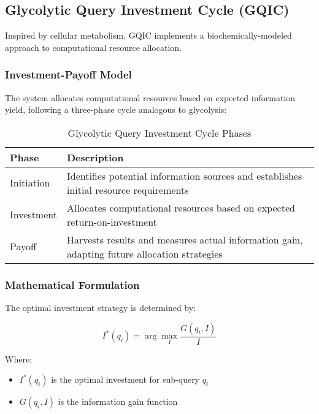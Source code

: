 \documentclass[journal,onecolumn]{IEEEtran}
\begin{document}
\subsection{Glycolytic Query Investment Cycle (GQIC)}

Inspired by cellular metabolism, GQIC implements a biochemically-modeled approach to computational resource allocation.

\subsubsection{Investment-Payoff Model}

The system allocates computational resources based on expected information yield, following a three-phase cycle analogous to glycolysis:

\begin{table}[ht]
\centering
\caption{Glycolytic Query Investment Cycle Phases}
\label{tab:gqic-phases}
\begin{tabular}{lp{8cm}}
\toprule
\textbf{Phase} & \textbf{Description} \\
\midrule
Initiation & Identifies potential information sources and establishes initial resource requirements \\
Investment & Allocates computational resources based on expected return-on-investment \\
Payoff & Harvests results and measures actual information gain, adapting future allocation strategies \\
\bottomrule
\end{tabular}
\end{table}

\subsubsection{Mathematical Formulation}

The optimal investment strategy is determined by:

\begin{equation}
I^*(q_i) = \arg\max_{I} \frac{G(q_i, I)}{I}
\end{equation}

Where:
\begin{itemize}
\item $I^*(q_i)$ is the optimal investment for sub-query $q_i$
\item $G(q_i, I)$ is the information gain function
\end{itemize}
\end{document}
